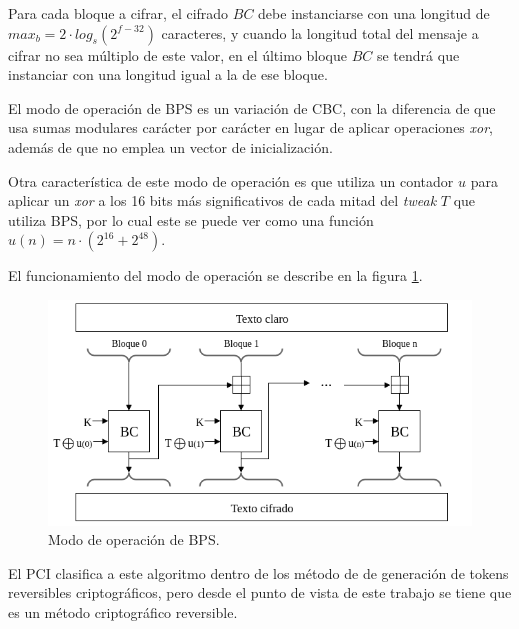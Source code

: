 Para cada bloque a cifrar, el cifrado $BC$ debe instanciarse con una longitud
de $max_b = 2 \cdot log_s(2^{f-32})$ caracteres, y cuando la longitud total
del mensaje a cifrar no sea múltiplo de este valor, en el último bloque $BC$
se tendrá que instanciar con una longitud igual a la de ese bloque.

El modo de operación de BPS es un variación de CBC, con la diferencia de que
usa sumas modulares carácter por carácter en lugar de aplicar operaciones
\textit{xor}, además de que no emplea un vector de inicialización.

Otra característica de este modo de operación es que utiliza un contador $u$
para aplicar un \textit{xor} a los 16 bits más significativos de cada mitad
del \textit{tweak} $T$ que utiliza BPS, por lo cual este se puede ver como
una función $u(n) = n \cdot (2^{16} + 2^{48})$.

El funcionamiento del modo de operación se describe en la figura \ref{modo_bps}.

\begin{figure}
  \begin{center}
    \includegraphics[width=0.85\linewidth]
    {../../../diagramas_comunes/bps/modo_de_operacion_bps}
    \caption{Modo de operación de BPS.}
    \label{modo_bps}
   \end{center}
\end{figure}

El PCI clasifica a este algoritmo dentro de los método de de generación de
tokens reversibles criptográficos, pero desde el punto de vista de este
trabajo se tiene que es un método criptográfico reversible.

